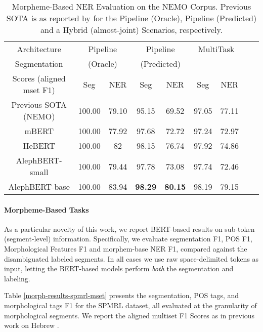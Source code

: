 \documentclass[11pt,a4paper]{article}
\begin{document}
\begin{table*}[t]
    \centering
    \begin{tabular}{| *{9}{c|} }
    \hline
    Architecture & \multicolumn{2}{c|}{Pipeline}
            & \multicolumn{2}{c|}{Pipeline}
                    & \multicolumn{2}{c|}{MultiTask} \\
    Segmentation & \multicolumn{2}{c|}{(Oracle)}
            & \multicolumn{2}{c|}{(Predicted)}
                    & \multicolumn{2}{c|}{} \\
    Scores (aligned mset F1) & Seg & NER & Seg & NER & Seg & NER \\
    \hline\hline
    Previous SOTA (NEMO) & 100.00 & 79.10     &  95.15   &   69.52  &   97.05    &  77.11    \\
    \hline
    mBERT          &100.00 & 77.92 & 97.68 & 72.72 & 97.24 & 72.97 \\
    HeBERT         & 100.00 & 82    & 98.15 & 76.74 & 97.92 & 74.86 \\
    \hline\hline
    AlephBERT-small& 100.00 & 79.44 & 97.78 & 73.08 & 97.74 & 72.46 \\
    AlephBERT-base   & 100.00 & 83.94 & {\bf 98.29} & {\bf 80.15} & 98.19 & 79.15 \\
    \hline
    \end{tabular}
    \caption{Morpheme-Based NER Evaluation on the NEMO Corpus. Previous SOTA is as reported by \citet{nemo} for the Pipeline (Oracle), Pipeline (Predicted) and a Hybrid (almost-joint) Scenarios, respectively.}\label{ner-morph}
    \label{morph-ner-eval}
\end{table*}

\paragraph{Morpheme-Based Tasks}

As a particular novelty of this work, we  report BERT-based results on sub-token (segment-level) information. Specifically, we evaluate segmentation F1, POS F1, Morphological Features F1 and morphem-base NER F1, compared against the disambiguated labeled segments.
In all cases we use raw space-delimited tokens as input, letting the BERT-based models perform {\em both} the segmentation and labeling. 

Table \ref{morph-results-spmrl-mset} 
presents the segmentation, POS tags, and morphological tags F1  for the SPMRL dataset, all evaluated at the granularity of morphological segments.
We report the aligned multiset F1 Scores as in previous work on Hebrew    \cite{more2019tacl}.
\end{document}
